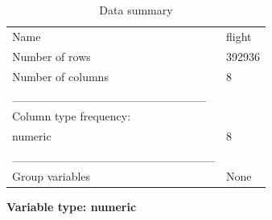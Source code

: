 \documentclass[
]{article}
\begin{document}
\begin{longtable}[]{@{}ll@{}}
\caption{Data summary}\tabularnewline
\toprule\noalign{}
\endfirsthead
\endhead
\bottomrule\noalign{}
\endlastfoot
Name & flight \\
Number of rows & 392936 \\
Number of columns & 8 \\
\_\_\_\_\_\_\_\_\_\_\_\_\_\_\_\_\_\_\_\_\_\_\_ & \\
Column type frequency: & \\
numeric & 8 \\
\_\_\_\_\_\_\_\_\_\_\_\_\_\_\_\_\_\_\_\_\_\_\_\_ & \\
Group variables & None \\
\end{longtable}

\textbf{Variable type: numeric}
\end{document}
